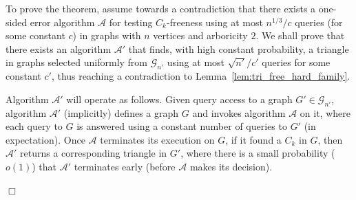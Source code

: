 \documentclass{article}
\newcommand{\calA}{{\mathcal{A}}}
\newcommand{\mA}{{\mathcal{A}}}
\newcommand{\mG}{{\mathcal{G}}}
\newcommand{\trn}{{n'}}
\newcommand{\trG}{{G'}}
\newcommand{\trA}{{\calA'}}
\newenvironment{proofof}[1]{\smallskip\noindent{\bf Proof of #1:}}%
        {\hspace*{\fill}$\Box$\par}
\newcommand{\commentt}[1]{ {}}
\begin{document}

\begin{proofof}{Theorem~\ref{thm:lb_ck_const_alpha}}
To prove the theorem, assume towards a contradiction that there exists a one-sided error algorithm $\mA$ for testing $C_k$-freeness using at most %
$n^{1/3}/c$ queries  (for some constant $c$)
in graphs with $n$ vertices and arboricity $2$.
We shall prove that  there exists an algorithm $\trA$ that %
finds, with high constant probability, a triangle in graphs selected uniformly from $\mG_{\trn}$ using at most $\sqrt{\trn}/c'$ queries 
 for some constant $c'$, thus reaching a contradiction to Lemma~\ref{lem:tri_free_hard_family}.

Algorithm $\trA$ will operate as follows. Given query access to a graph $\trG\in \mG_{\trn}$, algorithm $\trA$ (implicitly) defines a graph $G$ and invokes algorithm $\mA$ on it, where each query to $G$ is answered using a constant number of queries to $\trG$ (in expectation). 
Once $\mA$ terminates its execution on $G$, 
if it found  a $C_k$ in $G$, 
then $\trA$ returns a corresponding triangle in $\trG$, 
where there is a small  probability ($o(1)$) that $\trA$ terminates early (before $\mA$ makes its decision). 


\end{proofof}
\end{document}
